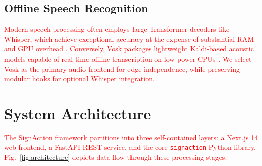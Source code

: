 \documentclass[conference,a4paper,10pt]{IEEEtran}
\begin{document}
\subsection{Offline Speech Recognition}

\textcolor{red}{Modern speech processing often employs large Transformer decoders like Whisper, which achieve exceptional accuracy at the expense of substantial RAM and GPU overhead \cite{radford2023}. Conversely, Vosk packages lightweight Kaldi-based acoustic models capable of real-time offline transcription on low-power CPUs \cite{vosk2021, povey2011}. We select Vosk as the primary audio frontend for edge independence, while preserving modular hooks for optional Whisper integration.}

\section{System Architecture}
\label{sec:arch}

\textcolor{red}{The SignAction framework partitions into three self-contained layers: a Next.js 14 web frontend, a FastAPI REST service, and the core \texttt{signaction} Python library. Fig.~\ref{fig:architecture} depicts data flow through these processing stages.}
\end{document}
